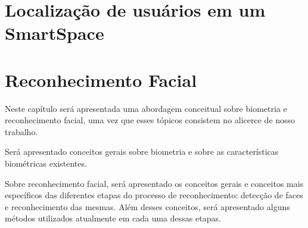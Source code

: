 
\chapter{Localização de usuários em um SmartSpace}


	

\chapter{Reconhecimento Facial}

	Neste capítulo será apresentada uma abordagem conceitual sobre biometria e reconhecimento facial, uma vez que esses tópicos consistem no alicerce de nosso trabalho. 

	Será apresentado conceitos gerais sobre biometria e sobre as características biométricas existentes.

	Sobre reconhecimento facial, será apresentado os conceitos gerais e conceitos mais específicos das diferentes etapas do processo de reconhecimento: detecção de faces e reconhecimento das mesmas. Além desses conceitos, será apresentado alguns métodos utilizados atualmente em cada uma dessas etapas.


	
	








